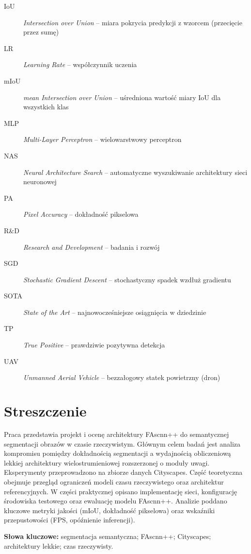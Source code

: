 \documentclass[final,a4paper,openany,12pt]{mwbk}
\begin{document}
\begin{description}
    \item[IoU] \textit{Intersection over Union} -- miara pokrycia predykcji z wzorcem (przecięcie przez sumę)
    \item[LR] \textit{Learning Rate} -- współczynnik uczenia
    \item[mIoU] \textit{mean Intersection over Union} -- uśredniona wartość miary IoU dla wszystkich klas
    \item[MLP] \textit{Multi-Layer Perceptron} -- wielowarstwowy perceptron
    \item[NAS] \textit{Neural Architecture Search} -- automatyczne wyszukiwanie architektury sieci neuronowej
    \item[PA] \textit{Pixel Accuracy} -- dokładność pikselowa
    \item[R\&D] \textit{Research and Development} -- badania i rozwój
    \item[SGD] \textit{Stochastic Gradient Descent} -- stochastyczny spadek wzdłuż gradientu
    \item[SOTA] \textit{State of the Art} -- najnowocześniejsze osiągnięcia w dziedzinie
    \item[TP] \textit{True Positive} -- prawdziwie pozytywna detekcja
    \item[UAV] \textit{Unmanned Aerial Vehicle} -- bezzałogowy statek powietrzny (dron)
\end{description}

\chapter*{Streszczenie}
Praca przedstawia projekt i ocenę architektury FAscnn++ do semantycznej segmentacji obrazów w czasie rzeczywistym. 
Głównym celem badań jest analiza kompromisu pomiędzy dokładnością segmentacji a wydajnością obliczeniową lekkiej architektury wielostrumieniowej rozszerzonej o moduły uwagi. 
Eksperymenty przeprowadzono na zbiorze danych Cityscapes. Część teoretyczna obejmuje przegląd ograniczeń modeli czasu rzeczywistego oraz architektur referencyjnych. 
W części praktycznej opisano implementację sieci, konfigurację środowiska testowego oraz ewaluację modelu FAscnn++. Analizie poddano kluczowe metryki jakości (mIoU, dokładność pikselowa) oraz wskaźniki przepustowości (FPS, opóźnienie inferencji).

\textbf{Słowa kluczowe:} segmentacja semantyczna; FAscnn++; Cityscapes; architektury lekkie; czas rzeczywisty.
\end{document}
